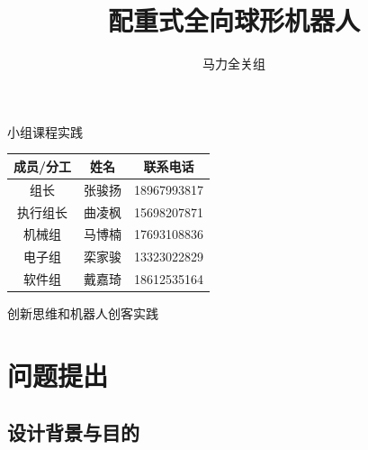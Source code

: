 \documentclass[a4paper]{ctexart}
\title{配重式全向球形机器人}
\author{马力全关组}
\numberwithin{equation}{section}
\numberwithin{table}{section}
\numberwithin{figure}{section}
\begin{document}


\begin{titlepage}

  \maketitle
  \begin{center}
    小组课程实践
  \end{center}


  \begin{center}
  \begin{tabular}[]{ccc}
  \toprule
  成员/分工 & 姓名 & 联系电话\\
  \midrule
  组长 & 张骏扬 & 18967993817 \\
  执行组长 & 曲凌枫 & 15698207871 \\
  机械组 & 马博楠 & 17693108836 \\
  电子组 & 栾家骏 & 13323022829 \\
  软件组 & 戴嘉琦 & 18612535164 \\
  \bottomrule
  \end{tabular}
\end{center}
  \addtocounter{table}{-1}

  
\begin{center}
  创新思维和机器人创客实践
\end{center}

\thispagestyle{empty}

\end{titlepage}

\addtocounter{page}{-2}

\newpage

\thispagestyle{fancy}
\lhead{}
\chead{\it\small{\textcolor{grey}{目录}}}
\rhead{}
\cfoot{}

\tableofcontents

\newpage


\pagestyle{fancy}
\fancyhead[RE, LO]{\it\small\rightmark}
\fancyhead[C]{\small{\it\textcolor{grey}{配重式球形机器人}}}

\section{问题提出}

\subsection{设计背景与目的}
\end{document}
